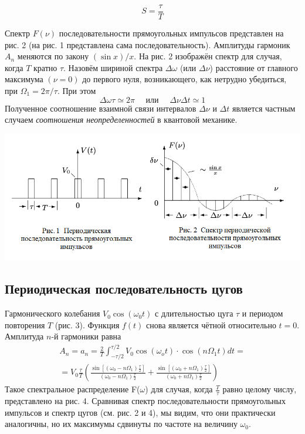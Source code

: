 \documentclass[a4paper,12pt]{article} %
\begin{document}
$$
S=\frac{\tau}{T}
$$

\hfill \break Спектр $F(\nu)$ последовательности прямоугольных импульсов представлен на рис. 2 (на рис. 1 представлена сама последовательность). Амплитуды гармоник $A_{n}$ меняются по закону $(\sin x) / x$.
На рис. 2 изображён спектр для случая, когда $T$ кратно $\tau .$ Назовём шириной спектра $\Delta \omega$ (или $\Delta \nu$) расстояние от главного максимума $(\nu=0)$ до первого нуля, возникающего, как нетрудно убедиться, при $\Omega_{1}=2 \pi / \tau$. При этом
$$
\Delta \omega \tau \simeq 2 \pi \quad \text { или } \quad \Delta \nu \Delta t \simeq 1
$$
Полученное соотношение взаимной связи интервалов $\Delta \nu$ и $\Delta t$ является
частным случаем \textit {соотношения неопределенностей} в квантовой механике.

 \begin{center}
\includegraphics[width=0.7\linewidth]{2.jpg}\\
\end{center}

\subsection{Периодическая последовательность цугов}
\hfill \break Гармонического колебания $V_{0} \cos \left(\omega_{0} t\right)$ с длительностью цуга $\tau$ и периодом повторения $T$ (рис. 3).
\hfill \break
\hfill \break
Функция $f(t)$ снова является чётной относительно $t=0 .$ Амплитуда $n$-й гармоники равна
$$
\begin{array}{c}
A_{n}=a_{n}=\frac{2}{T} \int_{-\tau / 2}^{\tau / 2} V_{0} \cos \left(\omega_{o} t\right) \cdot \cos \left(n \Omega_{1} t\right) d t= \\
=V_{0} \frac{\tau}{T}\left(\frac{\sin \left[\left(\omega_{0}-n \Omega_{1}\right) \frac{\tau}{2}\right]}{\left(\omega_{0}-n \Omega_{1}\right) \frac{\tau}{2}}+\frac{\sin \left[\left(\omega_{0}+n \Omega_{1}\right) \frac{\tau}{2}\right]}{\left(\omega_{0}+n \Omega_{1}\right) \frac{\tau}{2}}\right)
\end{array}
$$
\hfill \break
Такое спектральное распределение F($\omega$) для случая, когда $\frac T\tau$ равно целому числу, представлено на рис. 4. Сравнивая спектр последовательности прямоугольных импульсов и спектр цугов (см. рис. 2 и 4), мы видим, что они практически аналогичны, но их максимумы сдвинуты по частоте на величину $\omega_0$.
\end{document}
